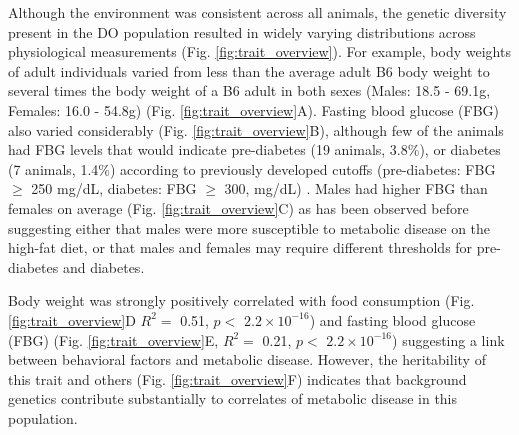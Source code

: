 \documentclass[
]{article}
\begin{document}
Although the environment was consistent across all animals, the genetic
diversity present in the DO population resulted in widely varying
distributions across physiological measurements (Fig.
\ref{fig:trait_overview}). For example, body weights of adult
individuals varied from less than the average adult B6 body weight to
several times the body weight of a B6 adult in both sexes (Males: 18.5 -
69.1g, Females: 16.0 - 54.8g) (Fig. \ref{fig:trait_overview}A). Fasting
blood glucose (FBG) also varied considerably (Fig.
\ref{fig:trait_overview}B), although few of the animals had FBG levels
that would indicate pre-diabetes (19 animals, 3.8\%), or diabetes (7
animals, 1.4\%) according to previously developed cutoffs (pre-diabetes:
FBG \(\geq\) 250 mg/dL, diabetes: FBG \(\geq\) 300, mg/dL)
\cite{pmid17018838}. Males had higher FBG than females on average (Fig.
\ref{fig:trait_overview}C) as has been observed before suggesting either
that males were more susceptible to metabolic disease on the high-fat
diet, or that males and females may require different thresholds for
pre-diabetes and diabetes.

Body weight was strongly positively correlated with food consumption
(Fig. \ref{fig:trait_overview}D \(R^2 =\) 0.51, \(p<\)
\ensuremath{2.2\times 10^{-16}}) and fasting blood glucose (FBG) (Fig.
\ref{fig:trait_overview}E, \(R^2=\) 0.21, \(p <\)
\ensuremath{2.2\times 10^{-16}}) suggesting a link between behavioral
factors and metabolic disease. However, the heritability of this trait
and others (Fig. \ref{fig:trait_overview}F) indicates that background
genetics contribute substantially to correlates of metabolic disease in
this population.
\end{document}
